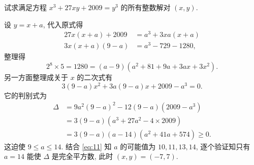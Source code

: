 \newpage
\begin{prob}
\label{prob:prob-7}
试求满足方程 $x^3 + 27xy + 2009 = y^3$
的所有整数解对 $(x,y)$.
\end{prob}

\begin{soln}
设 $y = x + a$, 代入原式得
\begin{align*}
27x(x+a) + 2009 &= a^3 + 3xa(x+a)\\
   3x(x+a)(9-a) &= a^3 - 729 - 1280,
\end{align*}
整理得
\begin{equation}
\label{eq:11}
2^8 \times 5 = 1280 = (a-9)(a^2 + 81 + 9a + 3ax + 3x^2).
\end{equation}
另一方面整理成关于 $x$ 的二次式有
\[
3(9-a)x^2 + 3a(9-a)x + 2009 - a^3 = 0.
\]
它的判别式为
\begin{align*}
\Delta &= 9a^2(9-a)^2 - 12(9-a)(2009-a^3)\\
       &= 3(9-a)(a^3 + 27a^2 - 4 \times 2009)\\
       &=3(9-a)(a-14)(a^2 + 41a + 574) \ge 0.
\end{align*}
这迫使 $9 \le a \le 14$. 结合 \cref{eq:11} 知 $a$ 的可能值为
$10, 11, 13, 14$, 逐个验证知只有 $a = 14$ 能使 $\Delta$ 是完全平方数,
此时 $(x, y) = (-7, 7)$.
\end{soln}
